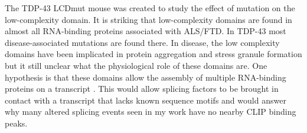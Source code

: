The TDP-43 LCDmut mouse was created to study the effect of mutation on the low-complexity domain. 
It is striking that low-complexity domains are found in almost all RNA-binding proteins associated with ALS/FTD.
In TDP-43 most disease-associated mutations are found there.
In disease, the low complexity domains have been implicated in protein aggregation and stress granule formation but it still unclear what the physiological role of these domains are.
One hypothesis is that these domains allow the assembly of multiple RNA-binding proteins on a transcript \citep{Gueroussov2017}. 
This would allow splicing factors to be brought in contact with a transcript that lacks known sequence motifs and would answer why many altered splicing events seen in my work have no nearby CLIP binding peaks.














